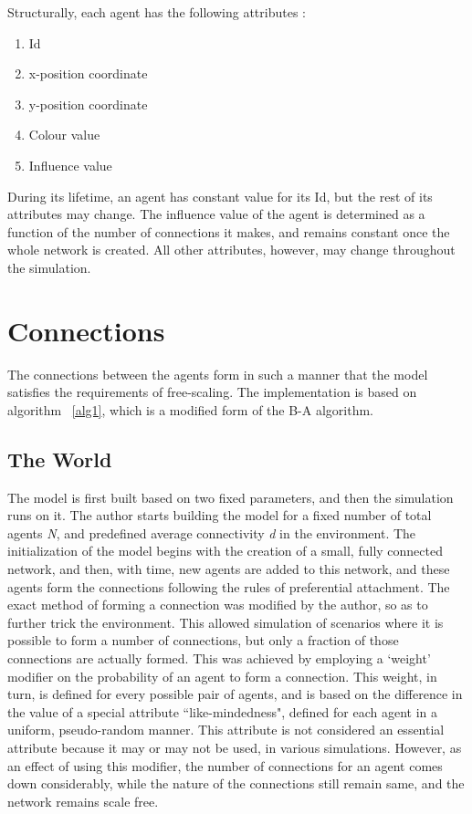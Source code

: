 Structurally, each agent has the following attributes :

\begin{enumerate}
\item Id
\item x-position coordinate
\item y-position coordinate
\item Colour value
\item Influence value
\end{enumerate}

During its lifetime, an agent has constant value for its Id, but the rest of its attributes may change. The influence value of the agent is determined as a function of the number of connections it makes, and remains constant once the whole network is created. All other attributes, however, may change throughout the simulation.


\section{Connections}
The connections between the agents form in such a manner that the model satisfies the requirements of free-scaling. The implementation is based on algorithm ~\ref{alg1}, which is a modified form of the B-A algorithm.

\subsection{The World}
The model is first built based on two fixed parameters, and then the simulation runs on it.
The author starts building the model for a fixed number of total agents \emph{N}, and predefined average connectivity \emph{d} in the environment.
The initialization of the model begins with the creation of a small, fully connected network, and then, with time, new agents are added to this network, and these agents form the connections following the rules of preferential attachment.
The exact method of forming a connection was modified by the author, so as to further trick the environment. This allowed simulation of scenarios where it is possible to form a number of connections, but only a fraction of those connections are actually formed. This was achieved by employing a `weight' modifier on the probability of an agent to form a connection. This weight, in turn, is defined for every possible pair of agents, and is based on the difference in the value of a special attribute ``like-mindedness", defined for each agent in a uniform, pseudo-random manner.
This attribute is not considered an essential attribute because it may or may not be used, in various simulations. However, as an effect of using this modifier, the number of connections for an agent comes down considerably, while the nature of the connections still remain same, and the network remains scale free.


